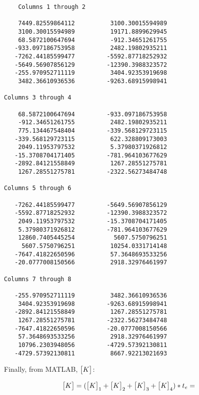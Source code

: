 \documentclass[../main.tex]{subfiles}
\begin{document}
\begin{verbatim}
    Columns 1 through 2

    7449.82559864112          3100.30015594989
    3100.30015594989          19171.8899629945
    68.5872100647694          -912.34651261755
   -933.097186753958          2482.19802935211
   -7262.44185599477         -5592.87718252932
   -5649.56907856129         -12390.3988323572
   -255.970952711119          3404.92353919698
    3482.36610936536         -9263.68915998941

Columns 3 through 4

    68.5872100647694         -933.097186753958
    -912.34651261755          2482.19802935211
    775.134467548404         -339.568129723115
   -339.568129723115          622.328809173003
    2049.11953797532          5.37980371926812
   -15.3708704171405         -781.964103677629
   -2892.84121558849          1267.28551275781
    1267.28551275781         -2322.56273484748

Columns 5 through 6

   -7262.44185599477         -5649.56907856129
   -5592.87718252932         -12390.3988323572
    2049.11953797532         -15.3708704171405
    5.37980371926812         -781.964103677629
    12860.7405445254           5607.5750796251
     5607.5750796251          10254.0331714148
   -7647.41822650596          57.3648693533256
   -20.0777008150566          2918.32976461997

Columns 7 through 8

   -255.970952711119          3482.36610936536
    3404.92353919698         -9263.68915998941
   -2892.84121558849          1267.28551275781
    1267.28551275781         -2322.56273484748
   -7647.41822650596         -20.0777008150566
    57.3648693533256          2918.32976461997
    10796.2303948056         -4729.57392130811
   -4729.57392130811          8667.92213021693

\end{verbatim}

Finally, from MATLAB, \(\mqty[K]\):

\[
    \mqty[K] = (\mqty[K]_1 + \mqty[K]_2 + \mqty[K]_3 + \mqty[K]_4)*t_e =    
\]
\end{document}
